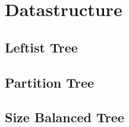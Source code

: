 \section{Datastructure}
	\subsection{Leftist Tree}
		
	\subsection{Partition Tree}
		
	\subsection{Size Balanced Tree}
		
